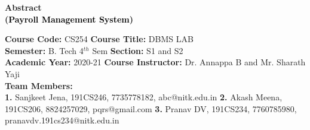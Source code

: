 \documentclass[12pt]{article}
\begin{document}


\begin{center}
    \textbf{\Large{Abstract \\
    (\textcolor{black}{Payroll Management System})}}
\end{center}

\noindent 
\textbf{Course Code:} CS254
\hspace{2in} 
\textbf{Course Title:} DBMS LAB \\
\textbf{Semester:} B. Tech 4$^{th}$ Sem 
\hspace{1.6in} 
\textbf{Section:} S1 and S2 \\
\textbf{Academic Year:} 2020-21 
\hspace{1.8in} 
\textbf{Course Instructor:} Dr. Annappa B and Mr. Sharath Yaji \\
\textbf{Team Members:} \\
\textbf{1.} Sanjkeet Jena, 191CS246, 7735778182, abc@nitk.edu.in 
\newline
\textbf{2.} Akash Meena, 191CS206, 8824257029, pqrs@gmail.com
\newline
\textbf{3.} Pranav DV, 191CS234, 7760785980, pranavdv.191cs234@nitk.edu.in

\vspace{0.25in}
\end{document}
